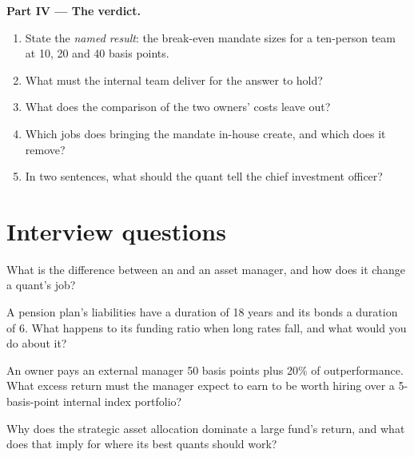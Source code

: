\begin{problem}
\medskip\noindent\textbf{Part IV --- The verdict.}
\begin{enumerate}[resume]
\item State the \emph{named result}: the break-even mandate sizes for a ten-person team at 10, 20 and 40 basis points.
\item What must the internal team deliver for the answer to hold?
\item What does the comparison of the two owners' costs leave out?
\item Which jobs does bringing the mandate in-house create, and which does it remove?
\item In two sentences, what should the quant tell the chief investment officer?
\end{enumerate}
\end{problem}

\section{Interview questions}

\begin{interviewq}\label{iq:in:asset-managers-pensions-sovereign-funds-and-insurers:1}
What is the difference between an  and an asset manager, and how does it change a quant's job?
\end{interviewq}

\begin{interviewq}\label{iq:in:asset-managers-pensions-sovereign-funds-and-insurers:2}
A pension plan's liabilities have a duration of 18 years and its bonds a duration of 6. What happens to its funding
ratio when long rates fall, and what would you do about it?
\end{interviewq}

\begin{interviewq}\label{iq:in:asset-managers-pensions-sovereign-funds-and-insurers:3}
An owner pays an external manager 50 basis points plus 20\% of outperformance. What excess return must the manager
expect to earn to be worth hiring over a 5-basis-point internal index portfolio?
\end{interviewq}

\begin{interviewq}\label{iq:in:asset-managers-pensions-sovereign-funds-and-insurers:4}
Why does the strategic asset allocation dominate a large fund's return, and what does that imply for where its best
quants should work?
\end{interviewq}

